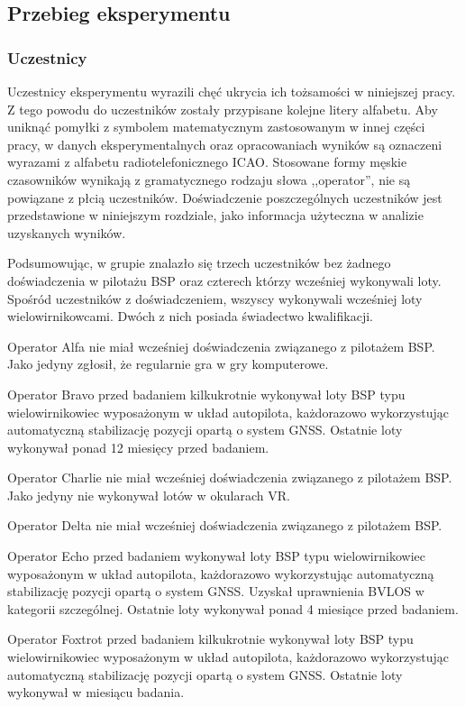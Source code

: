 \subsection{Przebieg eksperymentu}

\subsubsection{Uczestnicy}
Uczestnicy eksperymentu wyrazili chęć ukrycia ich tożsamości w niniejszej pracy. Z tego powodu do uczestników zostały przypisane kolejne litery alfabetu. Aby uniknąć pomyłki z symbolem matematycznym zastosowanym w innej części pracy, w danych eksperymentalnych oraz opracowaniach wyników są oznaczeni wyrazami z alfabetu radiotelefonicznego ICAO. Stosowane formy męskie czasowników wynikają z gramatycznego rodzaju słowa ,,operator'', nie są powiązane z płcią uczestników. Doświadczenie poszczególnych uczestników jest przedstawione w niniejszym rozdziale, jako informacja użyteczna w analizie uzyskanych wyników.

Podsumowując, w grupie znalazło się trzech uczestników bez żadnego doświadczenia w pilotażu BSP oraz czterech którzy wcześniej wykonywali loty. Spośród uczestników z doświadczeniem, wszyscy wykonywali wcześniej loty wielowirnikowcami. Dwóch z nich posiada świadectwo kwalifikacji.

Operator Alfa nie miał wcześniej doświadczenia związanego z pilotażem BSP. Jako jedyny zgłosił, że regularnie gra w gry komputerowe.

Operator Bravo przed badaniem kilkukrotnie wykonywał loty BSP typu wielowirnikowiec wyposażonym w układ autopilota, każdorazowo wykorzystując automatyczną stabilizację pozycji opartą o system GNSS. Ostatnie loty wykonywał ponad 12 miesięcy przed badaniem.

Operator Charlie nie miał wcześniej doświadczenia związanego z pilotażem BSP. Jako jedyny nie wykonywał lotów w okularach VR.

Operator Delta nie miał wcześniej doświadczenia związanego z pilotażem BSP.

Operator Echo przed badaniem wykonywał loty BSP typu wielowirnikowiec wyposażonym w układ autopilota, każdorazowo wykorzystując automatyczną stabilizację pozycji opartą o system GNSS. Uzyskał uprawnienia BVLOS w kategorii szczególnej. Ostatnie loty wykonywał ponad 4 miesiące przed badaniem.

Operator Foxtrot przed badaniem kilkukrotnie wykonywał loty BSP typu wielowirnikowiec wyposażonym w układ autopilota, każdorazowo wykorzystując automatyczną stabilizację pozycji opartą o system GNSS. Ostatnie loty wykonywał w miesiącu badania.

